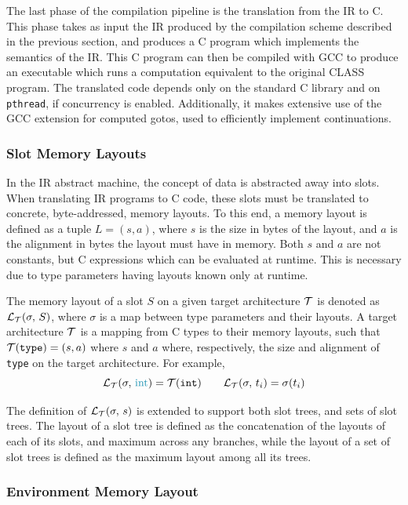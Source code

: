 \documentclass[sigconf,nonacm,natbib=true]{acmart}
\begin{document}
The last phase of the compilation pipeline is the translation from the \ac{IR} to C. This phase takes as input the \ac{IR} produced by the compilation scheme described in the previous section, and produces a C program which implements the semantics of the \ac{IR}. This C program can then be compiled with \ac{GCC} to produce an executable which runs a computation equivalent to the original \ac{CLASS} program. The translated code depends only on the standard C library and on \texttt{pthread}, if concurrency is enabled. Additionally, it makes extensive use of the \ac{GCC} extension for computed gotos, used to efficiently implement continuations.

\subsubsection{Slot Memory Layouts}

In the \ac{IR} abstract machine, the concept of data is abstracted away into slots. When translating \ac{IR} programs to C code, these slots must be translated to concrete, byte-addressed, memory layouts. To this end, a memory layout is defined as a tuple $L = (s, a)$, where $s$ is the size in bytes of the layout, and $a$ is the alignment in bytes the layout must have in memory. Both $s$ and $a$ are not constants, but C expressions which can be evaluated at runtime. This is necessary due to type parameters having layouts known only at runtime.

The memory layout of a slot $S$ on a given target architecture $\mathcal{T}$ is denoted as $\mathcal{L}_{\mathcal{T}}(\sigma,\,S)$, where $\sigma$ is a map between type parameters and their layouts. A target architecture $\mathcal{T}$ is a mapping from C types to their memory layouts, such that $\mathcal{T}(\texttt{type}) = (s, a)$ where $s$ and $a$ where, respectively, the size and alignment of \texttt{type} on the target architecture. For example,
\[\slotlayout{\sigma}{\ints} = \archlayout{\texttt{int}} \quad\quad \slotlayout{\sigma}{\vars{i}} = \sigma(t_i)\]

The definition of $\mathcal{L}_{\mathcal{T}}(\sigma,\,s)$ is extended to support both slot trees, and sets of slot trees. The layout of a slot tree is defined as the concatenation of the layouts of each of its slots, and maximum across any branches, while the layout of a set of slot trees is defined as the maximum layout among all its trees.

\subsubsection{Environment Memory Layout}
\end{document}
